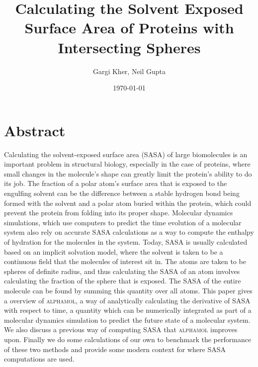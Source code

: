 \documentclass{article}
\title{Calculating the Solvent Exposed Surface Area of Proteins with Intersecting Spheres} %
\author{Gargi Kher, Neil Gupta}
\date{\today}
\begin{document}
\maketitle
\tableofcontents
\newpage
\section{Abstract}
Calculating the solvent-exposed surface area (SASA) of large biomolecules is an important problem in structural biology, especially in the case of proteins, where small changes in the molecule's shape can greatly limit the protein's ability to do its job. The fraction of a polar atom's surface area that is exposed to the engulfing solvent can be the difference between a stable hydrogen bond being formed with the solvent and a polar atom buried within the protein, which could prevent the protein from folding into its proper shape. Molecular dynamics simulations, which use computers to predict the time evolution of a molecular system also rely on accurate SASA calculations as a way to compute the enthalpy of hydration for the molecules in the system. Today, SASA is usually calculated based on an implicit solvation model, where the solvent is taken to be a continuous field that the molecules of interest sit in. The atoms are taken to be spheres of definite radius, and thus calculating the SASA of an atom involves calculating the fraction of the sphere that is exposed. The SASA of the entire molecule can be found by summing this quantity over all atoms. This paper gives a overview of \textsc{alphamol}, a way of analytically calculating the derivative of SASA with respect to time, a quantity which can be numerically integrated as part of a molecular dynamics simulation to predict the future state of a molecular system. We also discuss a previous way of computing SASA that \textsc{alphamol} improves upon. Finally we do some calculations of our own to benchmark the performance of these two methods and provide some modern context for where SASA computations are used.
\end{document}
